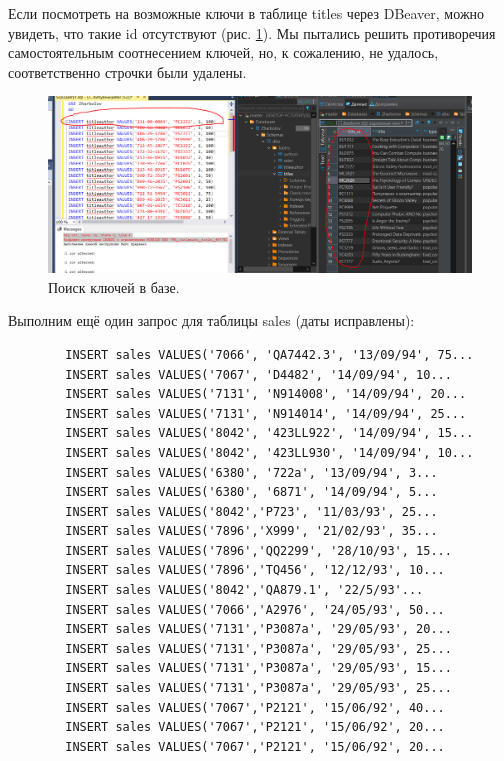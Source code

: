 Если посмотреть на возможные ключи в таблице titles через DBeaver, можно увидеть, что такие id отсутствуют (рис. \ref{fig:TAQ1ES}). Мы пытались решить противоречия самостоятельным соотнесением ключей, но, к сожалению, не удалось, соответственно строчки были удалены. 
\begin{figure}[h!]
    \centering
    \includegraphics[width=\linewidth]{Pic/lab3/TAQ1ESolve.PNG}
    \caption{Поиск ключей в базе.}
    \label{fig:TAQ1ES}
\end{figure}

Выполним ещё один запрос для таблицы sales (даты исправлены):
\begin{verbatim}
        INSERT sales VALUES('7066', 'QA7442.3', '13/09/94', 75...
        INSERT sales VALUES('7067', 'D4482', '14/09/94', 10...
        INSERT sales VALUES('7131', 'N914008', '14/09/94', 20...
        INSERT sales VALUES('7131', 'N914014', '14/09/94', 25...
        INSERT sales VALUES('8042', '423LL922', '14/09/94', 15...
        INSERT sales VALUES('8042', '423LL930', '14/09/94', 10...
        INSERT sales VALUES('6380', '722a', '13/09/94', 3...
        INSERT sales VALUES('6380', '6871', '14/09/94', 5...
        INSERT sales VALUES('8042','P723', '11/03/93', 25...
        INSERT sales VALUES('7896','X999', '21/02/93', 35...
        INSERT sales VALUES('7896','QQ2299', '28/10/93', 15...
        INSERT sales VALUES('7896','TQ456', '12/12/93', 10...
        INSERT sales VALUES('8042','QA879.1', '22/5/93'...
        INSERT sales VALUES('7066','A2976', '24/05/93', 50...
        INSERT sales VALUES('7131','P3087a', '29/05/93', 20...
        INSERT sales VALUES('7131','P3087a', '29/05/93', 25...
        INSERT sales VALUES('7131','P3087a', '29/05/93', 15...
        INSERT sales VALUES('7131','P3087a', '29/05/93', 25...
        INSERT sales VALUES('7067','P2121', '15/06/92', 40...
        INSERT sales VALUES('7067','P2121', '15/06/92', 20...
        INSERT sales VALUES('7067','P2121', '15/06/92', 20...
\end{verbatim}

